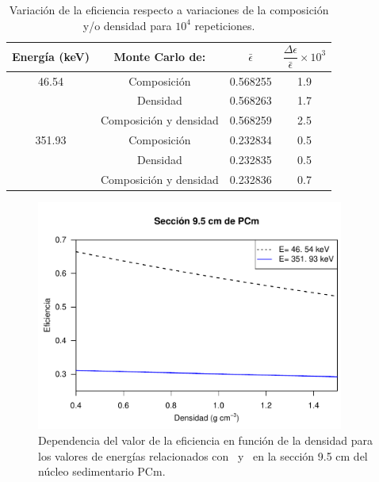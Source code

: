 \begin{table}
\centering
\caption{Variación de la eficiencia respecto a variaciones de la composición y/o densidad para $10^4$ repeticiones.}\label{Tabla-MonteCarlos-Effi}
\begin{tabular}{cccc}
\hline									
\rowcolor{Blue2}	Energía (keV)	&	Monte Carlo de:	&	$\bar{\epsilon} $	&	$\dfrac{\Delta \epsilon}{\bar{\epsilon}}\times 10^3 $	\\ 	\hline
\rowcolor{Blue1}	46.54	&	Composición	&	0.568255	&	1.9	\\ 	
\rowcolor{Blue1}		&	Densidad	&	0.568263	&	1.7	\\ 	
\rowcolor{Blue1}		&	Composición y densidad	&	0.568259	&	2.5	\\ 	\hline
\rowcolor{Blue1}	351.93	&	Composición	&	0.232834	&	0.5	\\ 	
\rowcolor{Blue1}		&	Densidad	&	0.232835	&	0.5	\\ 	
\rowcolor{Blue1}		&	Composición y densidad	&	0.232836	&	0.7	\\ 	\hline
\end{tabular}
\end{table}
\begin{figure}
\centering
\includegraphics[width=0.9\textwidth]{Imagenes/Eficiencia-densidad.pdf}
\caption{Dependencia del valor de la eficiencia en función de la densidad para los valores de energías relacionados con \PbCero\, y \PbCuatro\, en la sección 9.5 cm del núcleo sedimentario PCm.}\label{Fig-EffDensidad2}
\end{figure}
